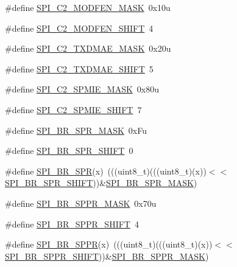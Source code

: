 \begin{DoxyCompactItemize}
\item 
\#define \hyperlink{group___s_p_i___register___masks_ga447f4723c0ee7499e14bea6cd0c8d3ac}{S\+P\+I\+\_\+\+C2\+\_\+\+M\+O\+D\+F\+E\+N\+\_\+\+M\+A\+SK}~0x10u
\item 
\#define \hyperlink{group___s_p_i___register___masks_ga7e2e1a75667ba2896d6056f5f886dec5}{S\+P\+I\+\_\+\+C2\+\_\+\+M\+O\+D\+F\+E\+N\+\_\+\+S\+H\+I\+FT}~4
\item 
\#define \hyperlink{group___s_p_i___register___masks_ga847c4ae3f2f0aed59df609ca39afb483}{S\+P\+I\+\_\+\+C2\+\_\+\+T\+X\+D\+M\+A\+E\+\_\+\+M\+A\+SK}~0x20u
\item 
\#define \hyperlink{group___s_p_i___register___masks_gaf1162ea05678ca446ca23d5e7ae0bc1f}{S\+P\+I\+\_\+\+C2\+\_\+\+T\+X\+D\+M\+A\+E\+\_\+\+S\+H\+I\+FT}~5
\item 
\#define \hyperlink{group___s_p_i___register___masks_ga734ac5ba36a5402f92dd9ecf15a7a87b}{S\+P\+I\+\_\+\+C2\+\_\+\+S\+P\+M\+I\+E\+\_\+\+M\+A\+SK}~0x80u
\item 
\#define \hyperlink{group___s_p_i___register___masks_ga33a757ba520cab426978fbfc57957b5b}{S\+P\+I\+\_\+\+C2\+\_\+\+S\+P\+M\+I\+E\+\_\+\+S\+H\+I\+FT}~7
\item 
\#define \hyperlink{group___s_p_i___register___masks_gaac7263560f1cc81f8f3fb6a7089d5c26}{S\+P\+I\+\_\+\+B\+R\+\_\+\+S\+P\+R\+\_\+\+M\+A\+SK}~0x\+Fu
\item 
\#define \hyperlink{group___s_p_i___register___masks_ga49ebd0e5e9751438bc3968877baf2661}{S\+P\+I\+\_\+\+B\+R\+\_\+\+S\+P\+R\+\_\+\+S\+H\+I\+FT}~0
\item 
\#define \hyperlink{group___s_p_i___register___masks_ga3fc6dbcc300be115c0e5d1dbc99946a2}{S\+P\+I\+\_\+\+B\+R\+\_\+\+S\+PR}(x)~(((uint8\+\_\+t)(((uint8\+\_\+t)(x))$<$$<$\hyperlink{group___s_p_i___register___masks_ga49ebd0e5e9751438bc3968877baf2661}{S\+P\+I\+\_\+\+B\+R\+\_\+\+S\+P\+R\+\_\+\+S\+H\+I\+FT}))\&\hyperlink{group___s_p_i___register___masks_gaac7263560f1cc81f8f3fb6a7089d5c26}{S\+P\+I\+\_\+\+B\+R\+\_\+\+S\+P\+R\+\_\+\+M\+A\+SK})
\item 
\#define \hyperlink{group___s_p_i___register___masks_gaf3ca4981d609aac2f31d89c677192f7a}{S\+P\+I\+\_\+\+B\+R\+\_\+\+S\+P\+P\+R\+\_\+\+M\+A\+SK}~0x70u
\item 
\#define \hyperlink{group___s_p_i___register___masks_gac53e7d34efb934fe3232632a77301ca3}{S\+P\+I\+\_\+\+B\+R\+\_\+\+S\+P\+P\+R\+\_\+\+S\+H\+I\+FT}~4
\item 
\#define \hyperlink{group___s_p_i___register___masks_gafa708f7ca2a25aa8021d443cc060f64a}{S\+P\+I\+\_\+\+B\+R\+\_\+\+S\+P\+PR}(x)~(((uint8\+\_\+t)(((uint8\+\_\+t)(x))$<$$<$\hyperlink{group___s_p_i___register___masks_gac53e7d34efb934fe3232632a77301ca3}{S\+P\+I\+\_\+\+B\+R\+\_\+\+S\+P\+P\+R\+\_\+\+S\+H\+I\+FT}))\&\hyperlink{group___s_p_i___register___masks_gaf3ca4981d609aac2f31d89c677192f7a}{S\+P\+I\+\_\+\+B\+R\+\_\+\+S\+P\+P\+R\+\_\+\+M\+A\+SK})

\end{DoxyCompactItemize}
